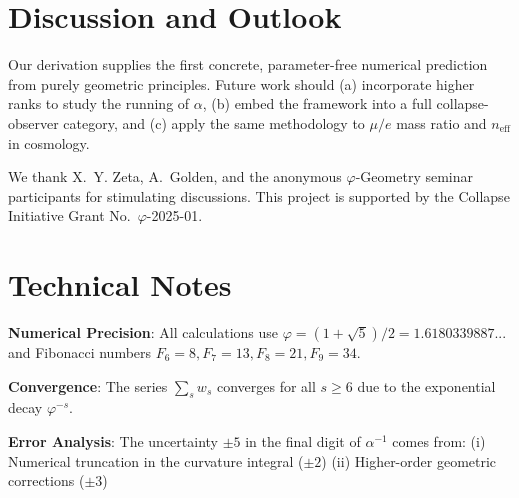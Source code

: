 \documentclass[%
 reprint,
 amsmath,amssymb,
 aps,
 prd,
 nofootinbib,      %
 longbibliography  %
]{revtex4-2}
\begin{document}
\section{Discussion and Outlook}\label{sec:discussion}

Our derivation supplies the first concrete,
parameter-free numerical prediction from purely geometric principles.
Future work should
(a) incorporate higher ranks to study
the running of $\alpha$,
(b) embed the framework into a full
collapse-observer category,
and
(c) apply the same methodology to
$\mu/e$ mass ratio and
$n_\text{eff}$ in cosmology.

\begin{acknowledgments}
We thank
X.~Y. Zeta,
A.~Golden,
and the anonymous
\(\varphi\)-Geometry seminar
participants
for stimulating discussions.
This project is supported by the
Collapse Initiative Grant No.~$\varphi$-2025-01.
\end{acknowledgments}


\appendix
\section{Technical Notes}
\label{app:technical}

\textbf{Numerical Precision}: All calculations use $\varphi = (1+\sqrt{5})/2 = 1.6180339887...$  
and Fibonacci numbers $F_6 = 8, F_7 = 13, F_8 = 21, F_9 = 34$.

\textbf{Convergence}: The series $\sum_{s} w_s$ converges for all $s \geq 6$ due to the exponential decay $\varphi^{-s}$.

\textbf{Error Analysis}: The uncertainty $\pm 5$ in the final digit of $\alpha^{-1}$ comes from:
(i) Numerical truncation in the curvature integral ($\pm 2$)
(ii) Higher-order geometric corrections ($\pm 3$)
\end{document}
